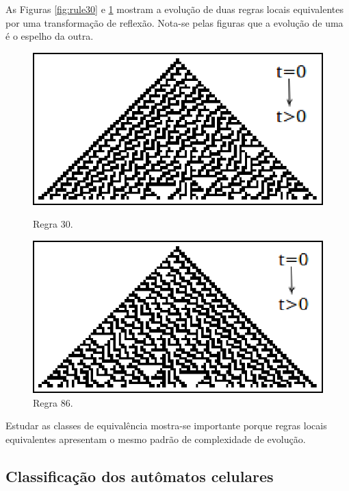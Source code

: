 \documentclass[12pt,a4paper]{article}
\begin{document}
As Figuras \ref{fig:rule30} e \ref{fig:rule86} mostram a evolução de duas regras locais
equivalentes por uma transformação de reflexão. Nota-se pelas figuras que a evolução
de uma é o espelho da outra.

\begin{figure}[ht]
\begin{minipage}[b]{0.5\linewidth}
\centering
\includegraphics[scale=0.85]{img/rule30.eps}
\caption{Regra 30.}
\label{fig:rule30}
\end{minipage}
\hspace{0.5cm}
\begin{minipage}[b]{0.5\linewidth}
\centering
\includegraphics[scale=0.85]{img/rule86.eps}
\caption{Regra 86.}
\label{fig:rule86}
\end{minipage}
\end{figure}

Estudar as classes de equivalência mostra-se importante porque regras locais
equivalentes apresentam o mesmo padrão de complexidade de evolução.

\subsection{Classificação dos autômatos celulares}
\end{document}
